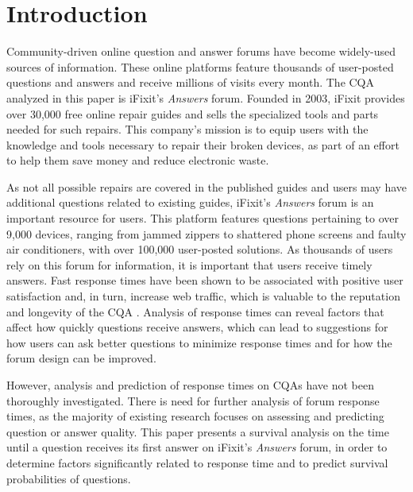 \documentclass[preprint]{elsarticle}
\begin{document}
\section{Introduction}

Community-driven online question and answer forums have become widely-used sources of information. These online platforms feature thousands of user-posted questions and answers and receive millions of visits every month. The CQA analyzed in this paper is iFixit's \textit{Answers} forum. Founded in 2003, iFixit provides over 30,000 free online repair guides and sells the specialized tools and parts needed for such repairs. This company's mission is to equip users with the knowledge and tools necessary to repair their broken devices, as part of an effort to help them save money and reduce electronic waste. 
    
As not all possible repairs are covered in the published guides and users may have additional questions related to existing guides, iFixit's \textit{Answers} forum is an important resource for users. This platform features questions pertaining to over 9,000 devices, ranging from jammed zippers to shattered phone screens and faulty air conditioners, with over 100,000 user-posted solutions. As thousands of users rely on this forum for information, it is important that users receive timely answers. Fast response times have been shown to be associated with positive user satisfaction and, in turn, increase web traffic, which is valuable to the reputation and longevity of the CQA \cite{Rechavi2011}. Analysis of response times can reveal factors that affect how quickly questions receive answers, which can lead to suggestions for how users can ask better questions to minimize response times and for how the forum design can be improved.

However, analysis and prediction of response times on CQAs have not been thoroughly investigated. There is need for further analysis of forum response times, as the majority of existing research focuses on assessing and predicting question or answer quality. This paper presents a survival analysis on the time until a question receives its first answer on iFixit's \textit{Answers} forum, in order to determine factors significantly related to response time and to predict survival probabilities of questions.

\end{document}
